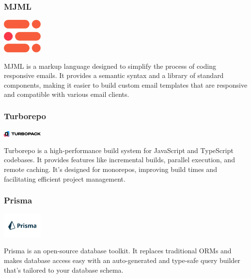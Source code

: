 \subsubsection{MJML}

\begin{center}
\includegraphics[width=0.15\textwidth]{Images/logos/file-type-mjml.512x453.png}
\label{fig:MJML}
\end{center}
MJML is a markup language designed to simplify the process of coding responsive emails. It provides a semantic syntax and a library of standard components, making it easier to build custom email templates that are responsive and compatible with various email clients.

\subsubsection{Turborepo}

\begin{center}
\includegraphics[width=0.15\textwidth]{Images/logos/turbopack-logotype-light-background.png}
\label{fig:turborepo}
\end{center}
Turborepo is a high-performance build system for JavaScript and TypeScript codebases. It provides features like incremental builds, parallel execution, and remote caching. It’s designed for monorepos, improving build times and facilitating efficient project management.

\subsubsection{Prisma}

\begin{center}
\includegraphics[width=0.15\textwidth]{Images/logos/Prisma.png}
\label{fig:prisma}
\end{center}
Prisma is an open-source database toolkit. It replaces traditional ORMs and makes database access easy with an auto-generated and type-safe query builder that’s tailored to your database schema.


